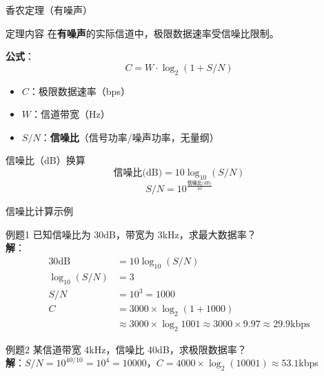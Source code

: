 \documentclass[10pt, aspectratio=169]{beamer}
\begin{document}
\begin{frame}{香农定理（有噪声）}
    \begin{block}{定理内容}
        在\textbf{有噪声}的实际信道中，极限数据速率受信噪比限制。
    \end{block}
    \vspace{0.3em}
    \textbf{公式}：
    $$C = W \cdot \log_2(1 + S/N)$$
    \begin{itemize}
        \item $C$：极限数据速率（bps）
        \item $W$：信道带宽（Hz）
        \item $S/N$：\textbf{信噪比}（信号功率/噪声功率，无量纲）
    \end{itemize}
    \vspace{0.5em}
    \begin{block}{信噪比（dB）换算}
        $$\text{信噪比(dB)} = 10\log_{10}(S/N)$$
        \vspace{-0.5em}
        $$S/N = 10^{\frac{\text{信噪比(dB)}}{10}}$$
    \end{block}
\end{frame}

\begin{frame}{信噪比计算示例}
    \begin{exampleblock}{例题1}
        已知信噪比为 30dB，带宽为 3kHz，求最大数据率？\\
        \textbf{解}：
        \begin{align*}
            30\text{dB} &= 10\log_{10}(S/N) \\
            \log_{10}(S/N) &= 3 \\
            S/N &= 10^3 = 1000 \\
            C &= 3000 \times \log_2(1 + 1000) \\
            &\approx 3000 \times \log_2 1001 \approx 3000 \times 9.97 \approx 29.9\text{kbps}
        \end{align*}
    \end{exampleblock}
    \vspace{0.3em}
    \begin{exampleblock}{例题2}
        某信道带宽 4kHz，信噪比 40dB，求极限数据率？\\
        \textbf{解}：$S/N = 10^{40/10} = 10^4 = 10000$，$C = 4000 \times \log_2(10001) \approx 53.1$kbps
    \end{exampleblock}
\end{frame}
\end{document}
